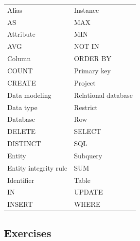 \documentclass[
]{article}
\begin{document}
\begin{longtable}[]{@{}ll@{}}
\toprule()
\endhead
Alias & Instance \\
AS & MAX \\
Attribute & MIN \\
AVG & NOT IN \\
Column & ORDER BY \\
COUNT & Primary key \\
CREATE & Project \\
Data modeling & Relational database \\
Data type & Restrict \\
Database & Row \\
DELETE & SELECT \\
DISTINCT & SQL \\
Entity & Subquery \\
Entity integrity rule & SUM \\
Identifier & Table \\
IN & UPDATE \\
INSERT & WHERE \\
\bottomrule()
\end{longtable}

\hypertarget{exercises}{%
\subsection*{Exercises}\label{exercises}}
\end{document}
